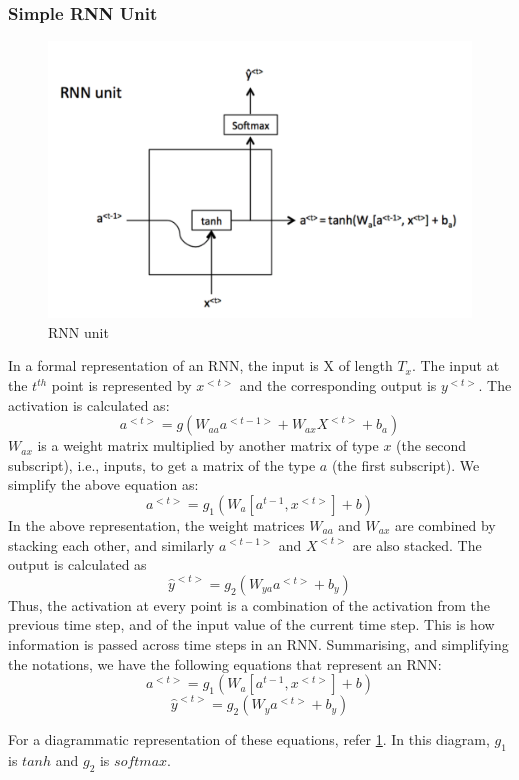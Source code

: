 \subsubsection{Simple RNN Unit}

\begin{figure}
    \centering
    \includegraphics[height=0.2\paperheight]{Figures/RNN_unit.png}
    \caption{RNN unit\cite{cavaioni_deeplearning_2018}}
    \label{fig:rnn_unit}
\end{figure}

In a formal representation of an RNN, the input is X of length \(T_x\). The input at the \(t^{th}\) point is represented by \(x^{<t>}\) and the corresponding output is \(y^{<t>}\). The activation is calculated as:\[a^{<t>}=g(W_{aa}a^{<t-1>}+W_{ax}X^{<t>}+b_a)\]
\(W_{ax}\) is a weight matrix multiplied by another matrix of type \(x\) (the second subscript), i.e., inputs, to get a matrix of the type \(a\) (the first subscript). We simplify the above equation as:
\[a^{<t>}=g_1(W_a[a^{t-1},x^{<t>}]+b)\]
In the above representation, the weight matrices \(W_{aa}\) and \(W_{ax}\) are combined by stacking each other, and similarly \(a^{<t-1>}\) and \(X^{<t>}\) are also stacked. The output is calculated as
\[\hat{y}^{<t>}=g_2(W_{ya}a^{<t>}+b_y)\]
Thus, the activation at every point is a combination of the activation from the previous time step, and of the input value of the current time step. This is how information is passed across time steps in an RNN.
Summarising, and simplifying the notations, we have the following equations that represent an RNN:
\[a^{<t>}=g_1(W_a[a^{t-1},x^{<t>}]+b)\]
\[\hat{y}^{<t>}=g_2(W_{y}a^{<t>}+b_y)\]

For a diagrammatic representation of these equations, refer \ref{fig:rnn_unit}. In this diagram, \(g_1\) is \(tanh\) and \(g_2\) is \(softmax\).




